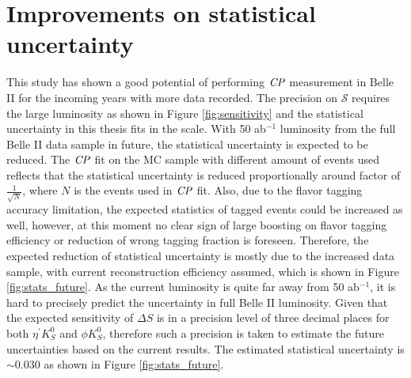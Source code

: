 
\section{Improvements on statistical uncertainty}
This study has shown a good potential of performing $\it{CP}$ measurement in Belle II for the incoming years with more data recorded. The precision on $\mathcal{S}$ requires the large luminosity as shown in Figure \ref{fig:sensitivity} and the statistical uncertainty in this thesis fits in the scale. With 50 ab$^{-1}$ luminosity from the full Belle II data sample in future, the statistical uncertainty is expected to be reduced. The $\it{CP}$ fit on the MC sample with different amount of events used reflects that the statistical uncertainty is reduced proportionally around factor of $\frac{1}{\sqrt{N}}$, where $N$ is the events used in $\it{CP}$ fit. Also, due to the flavor tagging accuracy limitation, the expected statistics of tagged events could be increased as well, however, at this moment no clear sign of large boosting on flavor tagging efficiency or reduction of wrong tagging fraction is foreseen. Therefore, the expected reduction of statistical uncertainty is mostly due to the increased data sample, with current reconstruction efficiency assumed, which is shown in Figure \ref{fig:stats_future}.  As the current luminosity is quite far away from 50 ab$^{-1}$, it is hard to precisely predict the uncertainty in full Belle II luminosity. Given that the expected sensitivity of $\Delta S$ is in a precision level of three decimal places for both $\eta^{'} K_S^0$ and $\phi K_S^0$\cite{b2book}, therefore such a precision is taken to estimate the future uncertainties based on the current results. The estimated statistical uncertainty is  $\sim 0.030$ as shown in Figure \ref{fig:stats_future}. 

